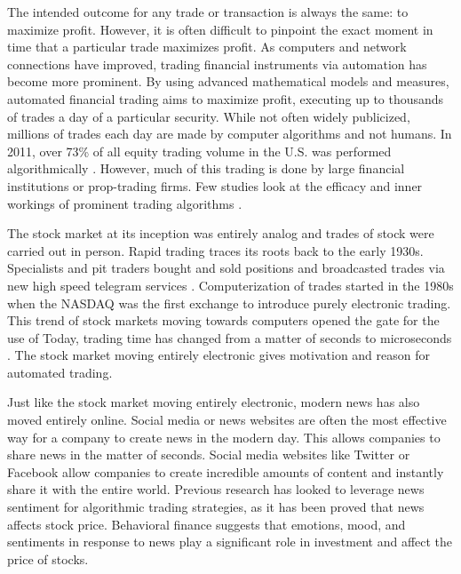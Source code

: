 \documentclass[../thesis.tex]{subfiles}
\begin{document}
 The intended outcome for any trade or transaction is always the same: to maximize profit. However, it is often difficult to pinpoint the exact moment in time that a particular trade maximizes profit. As computers and network connections have improved, trading financial instruments via automation has become more prominent. By using advanced mathematical models and measures, automated financial trading aims to maximize profit, executing up to thousands of trades a day of a particular security. While not often widely publicized, millions of trades each day are made by computer algorithms and not humans. In 2011, over 73\% of all equity trading volume in the U.S. was performed algorithmically \cite{Treleaven2013}. However, much of this trading is done by large financial institutions or prop-trading firms. Few studies look at the efficacy and inner workings of prominent trading algorithms \cite{Ehlers} \cite{Gatev2006}. 
  
The stock market at its inception was entirely analog and trades of stock were carried out in person. Rapid trading traces its roots back to the early 1930s. Specialists and pit traders bought and sold positions and broadcasted trades via new high speed telegram services \cite{Treleaven2013}.  Computerization of trades started in the 1980s when the NASDAQ was the first exchange to introduce purely electronic trading. This trend of stock markets moving towards computers opened the gate for the use of  Today, trading time has changed from a matter of seconds to microseconds \cite{Treleaven2013}. The stock market moving entirely electronic gives motivation and reason for automated trading. 

Just like the stock market moving entirely electronic, modern news has also moved entirely online. Social media or news websites are often the most effective way for a company to create news in the modern day. This allows companies to share news in the matter of seconds. Social media websites like Twitter or Facebook allow companies to create incredible amounts of content and instantly share it with the entire world. Previous research has looked to leverage news sentiment for algorithmic trading strategies, as it has been proved that news affects stock price\cite{Ho2016}. Behavioral finance suggests that emotions, mood, and sentiments in response to news play a significant role in investment and affect the price of stocks. 
 
\end{document}
